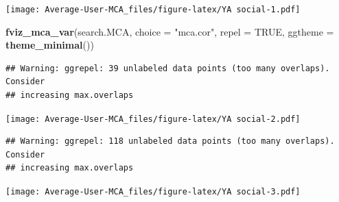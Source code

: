 \documentclass[
]{article}
\newenvironment{Shaded}{\begin{snugshade}}{\end{snugshade}}
\newcommand{\DataTypeTok}[1]{\textcolor[rgb]{0.13,0.29,0.53}{#1}}
\newcommand{\KeywordTok}[1]{\textcolor[rgb]{0.13,0.29,0.53}{\textbf{#1}}}
\newcommand{\NormalTok}[1]{#1}
\newcommand{\OtherTok}[1]{\textcolor[rgb]{0.56,0.35,0.01}{#1}}
\newcommand{\StringTok}[1]{\textcolor[rgb]{0.31,0.60,0.02}{#1}}
\begin{document}
\texttt{[image: Average-User-MCA\_files/figure-latex/YA social-1.pdf]}

\begin{Shaded}
\begin{Highlighting}[]
\KeywordTok{fviz_mca_var}\NormalTok{(search.MCA, }\DataTypeTok{choice =} \StringTok{"mca.cor"}\NormalTok{, }\DataTypeTok{repel =} \OtherTok{TRUE}\NormalTok{,}
             \DataTypeTok{ggtheme =} \KeywordTok{theme_minimal}\NormalTok{())}
\end{Highlighting}
\end{Shaded}

\begin{verbatim}
## Warning: ggrepel: 39 unlabeled data points (too many overlaps). Consider
## increasing max.overlaps
\end{verbatim}

\texttt{[image: Average-User-MCA\_files/figure-latex/YA social-2.pdf]}

\begin{Shaded}
\end{Shaded}

\begin{verbatim}
## Warning: ggrepel: 118 unlabeled data points (too many overlaps). Consider
## increasing max.overlaps
\end{verbatim}

\texttt{[image: Average-User-MCA\_files/figure-latex/YA social-3.pdf]}
\end{document}
